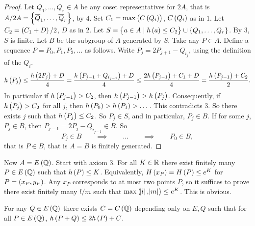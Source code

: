 \begin{proof}
Let $ Q_1, \dots, Q_r \in A $ be any coset representatives for $ 2A $, that is $ A / 2A = \cbr{\overline{Q}_1, \dots, \overline{Q}_r} $, by $ 4 $. Set $ C_1 = \max\br{C\br{Q_i}} $, $ C\br{Q_i} $ as in $ 1 $. Let $ C_2 = \br{C_1 + D} / 2 $, $ D $ as in $ 2 $. Let $ S = \cbr{a \in A \mid h\br{a} \le C_2} \cup \cbr{Q_1, \dots, Q_r} $. By $ 3 $, $ S $ is finite. Let $ B $ be the subgroup of $ A $ generated by $ S $. Take any $ P \in A $. Define a sequence $ P = P_0, P_1, P_2, \dots $ as follows. Write $ P_j = 2P_{j + 1} - Q_{i_j} $, using the definition of the $ Q_i $.
$$ h\br{P_j} \le \dfrac{h\br{2P_j} + D}{4} = \dfrac{h\br{P_{j - 1} + Q_{i_{j - 1}}} + D}{4} \le \dfrac{2h\br{P_{j - 1}} + C_1 + D}{4} = \dfrac{h\br{P_{j - 1}} + C_2}{2}. $$
In particular if $ h\br{P_{j - 1}} > C_2 $, then $ h\br{P_{j - 1}} > h\br{P_j} $. Consequently, if $ h\br{P_j} > C_2 $ for all $ j $, then $ h\br{P_0} > h\br{P_1} > \dots $. This contradicts $ 3 $. So there exists $ j $ such that $ h\br{P_j} \le C_2 $. So $ P_j \in S $, and in particular, $ P_j \in B $. If for some $ j $, $ P_j \in B $, then $ P_{j - 1} = 2P_j - Q_{i_{j - 1}} \in B $. So
$$ P_j \in B \qquad \implies \qquad \dots \qquad \implies \qquad P_0 \in B, $$
that is $ P \in B $, that is $ A = B $ is finitely generated.
\end{proof}

Now $ A = E\br{\Q} $. Start with axiom $ 3 $. For all $ K \in \mathbb{R} $ there exist finitely many $ P \in E\br{\Q} $ such that $ h\br{P} \le K $. Equivalently, $ H\br{x_P} = H\br{P} \le e^K $ for $ P = \br{x_P, y_P} $. Any $ x_P $ corresponds to at most two points $ P $, so it suffices to prove there exist finitely many $ l / m $ such that $ \max\br{\abs{l}, \abs{m}} \le e^K $. This is obvious.

\begin{lemma}
For any $ Q \in E\br{\Q} $ there exists $ C = C\br{\Q} $ depending only on $ E, Q $ such that for all $ P \in E\br{\Q} $, $ h\br{P + Q} \le 2h\br{P} + C $.
\end{lemma}

